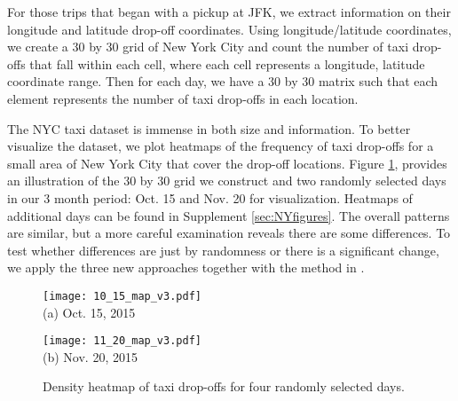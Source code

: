 \documentclass[arxiv, preprint]{imsart}
\numberwithin{equation}{section}
\theoremstyle{plain}
\begin{document}
For those trips that began with a pickup at JFK, we extract information on their longitude and latitude drop-off coordinates. Using longitude/latitude coordinates, we create a $30$ by $30$ grid of New York City and count the number of taxi drop-offs that fall within each cell, where each cell represents a longitude, latitude coordinate range. Then for each day, we have a $30$ by $30$ matrix such that each element represents the number of taxi drop-offs in each location. 

The NYC taxi dataset is immense in both size and information. To better visualize the dataset, we plot heatmaps of the frequency of taxi drop-offs for a small area of New York City that cover the drop-off locations. Figure \ref{fig:heatmaps}, provides an illustration of the $30$ by $30$ grid we construct and two randomly selected days in our 3 month period: Oct. 15 and Nov. 20 for visualization. Heatmaps of additional days can be found in Supplement \ref{sec:NYfigures}.  The overall patterns are similar, but a more careful examination reveals there are some differences. To test whether differences are just by randomness or there is a significant change, we apply the three new approaches together with the method in \cite{chen2015graph}. 


\begin{figure}[h]
  \begin{minipage}[b]{0.45\linewidth}
    \centering
    \texttt{[image: 10\_15\_map\_v3.pdf]} \\ (a) Oct. 15, 2015
    \vspace{3ex}
  \end{minipage}%
  \begin{minipage}[b]{0.45\linewidth}
    \centering
    \texttt{[image: 11\_20\_map\_v3.pdf]} \\ (b) Nov. 20, 2015
    \vspace{3ex}
  \end{minipage} 
\vspace{-5mm}
  \caption{Density heatmap of taxi drop-offs for four randomly selected days.}
  \label{fig:heatmaps}
\end{figure}
\end{document}
